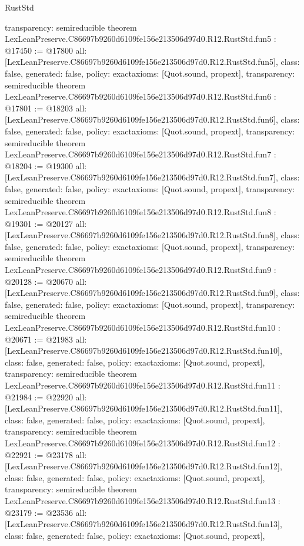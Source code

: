 \begin{lexlean}{RustStd}
\begin{coremodule}
{  transparency: semireducible
}
theorem LexLeanPreserve.C86697b9260d6109fe156e213506d97d0.R12.RustStd.fun5 : @17450 := @17800 {
  all: [LexLeanPreserve.C86697b9260d6109fe156e213506d97d0.R12.RustStd.fun5],
  class: false,
  generated: false,
  policy: exact{axioms: [Quot.sound, propext]},
  transparency: semireducible
}
theorem LexLeanPreserve.C86697b9260d6109fe156e213506d97d0.R12.RustStd.fun6 : @17801 := @18203 {
  all: [LexLeanPreserve.C86697b9260d6109fe156e213506d97d0.R12.RustStd.fun6],
  class: false,
  generated: false,
  policy: exact{axioms: [Quot.sound, propext]},
  transparency: semireducible
}
theorem LexLeanPreserve.C86697b9260d6109fe156e213506d97d0.R12.RustStd.fun7 : @18204 := @19300 {
  all: [LexLeanPreserve.C86697b9260d6109fe156e213506d97d0.R12.RustStd.fun7],
  class: false,
  generated: false,
  policy: exact{axioms: [Quot.sound, propext]},
  transparency: semireducible
}
theorem LexLeanPreserve.C86697b9260d6109fe156e213506d97d0.R12.RustStd.fun8 : @19301 := @20127 {
  all: [LexLeanPreserve.C86697b9260d6109fe156e213506d97d0.R12.RustStd.fun8],
  class: false,
  generated: false,
  policy: exact{axioms: [Quot.sound, propext]},
  transparency: semireducible
}
theorem LexLeanPreserve.C86697b9260d6109fe156e213506d97d0.R12.RustStd.fun9 : @20128 := @20670 {
  all: [LexLeanPreserve.C86697b9260d6109fe156e213506d97d0.R12.RustStd.fun9],
  class: false,
  generated: false,
  policy: exact{axioms: [Quot.sound, propext]},
  transparency: semireducible
}
theorem LexLeanPreserve.C86697b9260d6109fe156e213506d97d0.R12.RustStd.fun10 : @20671 := @21983 {
  all: [LexLeanPreserve.C86697b9260d6109fe156e213506d97d0.R12.RustStd.fun10],
  class: false,
  generated: false,
  policy: exact{axioms: [Quot.sound, propext]},
  transparency: semireducible
}
theorem LexLeanPreserve.C86697b9260d6109fe156e213506d97d0.R12.RustStd.fun11 : @21984 := @22920 {
  all: [LexLeanPreserve.C86697b9260d6109fe156e213506d97d0.R12.RustStd.fun11],
  class: false,
  generated: false,
  policy: exact{axioms: [Quot.sound, propext]},
  transparency: semireducible
}
theorem LexLeanPreserve.C86697b9260d6109fe156e213506d97d0.R12.RustStd.fun12 : @22921 := @23178 {
  all: [LexLeanPreserve.C86697b9260d6109fe156e213506d97d0.R12.RustStd.fun12],
  class: false,
  generated: false,
  policy: exact{axioms: [Quot.sound, propext]},
  transparency: semireducible
}
theorem LexLeanPreserve.C86697b9260d6109fe156e213506d97d0.R12.RustStd.fun13 : @23179 := @23536 {
  all: [LexLeanPreserve.C86697b9260d6109fe156e213506d97d0.R12.RustStd.fun13],
  class: false,
  generated: false,
  policy: exact{axioms: [Quot.sound, propext]},
}
\end{coremodule}
\end{lexlean}
